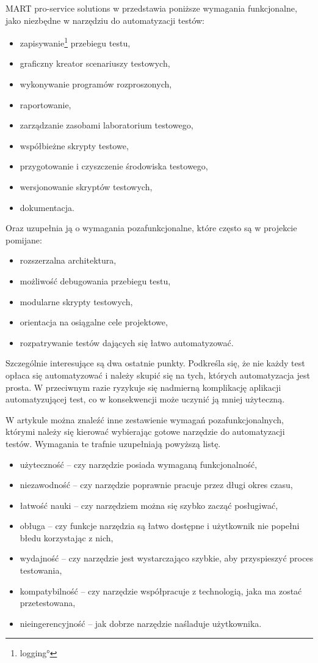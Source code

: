 \documentclass[00-praca-magisterska.tex]{subfiles}
\begin{document}
MART pro-service solutions w \cite{automation-fail} przedstawia poniższe
wymagania funkcjonalne, jako niezbędne w narzędziu do automatyzacji testów:
\begin{itemize}
\item zapisywanie\footnote{\ang{logging}} przebiegu testu,
\item graficzny kreator scenariuszy testowych,
\item wykonywanie programów rozproszonych,
\item raportowanie,
\item zarządzanie zasobami laboratorium testowego,
\item współbieżne skrypty testowe,
\item przygotowanie i czyszczenie środowiska testowego,
\item wersjonowanie skryptów testowych,
\item dokumentacja.
\end{itemize}

Oraz uzupełnia ją o wymagania pozafunkcjonalne, które często są w projekcie
pomijane:
\begin{itemize}
\item rozszerzalna architektura,
\item możliwość debugowania przebiegu testu,
\item modularne skrypty testowych,
\item orientacja na osiągalne cele projektowe,
\item rozpatrywanie testów dających się łatwo automatyzować.
\end{itemize}

Szczególnie interesujące są dwa ostatnie punkty. Podkreśla się, że nie każdy
test opłaca się automatyzować i należy skupić się na tych, których
automatyzacja jest prosta. W przeciwnym razie ryzykuje się nadmierną
komplikację aplikacji automatyzującej test, co w konsekwencji może uczynić ją
mniej użyteczną.

W artykule \cite{snake-oil} można znaleźć inne zestawienie wymagań
pozafunkcjonalnych, którymi należy się kierować wybierając gotowe narzędzie do
automatyzacji testów. Wymagania te trafnie uzupełniają powyższą listę.
\begin{itemize}
\item użyteczność -- czy narzędzie posiada wymaganą funkcjonalność,
\item niezawodność -- czy narzędzie poprawnie pracuje przez długi okres czasu,
\item łatwość nauki -- czy narzędziem można się szybko zacząć posługiwać,
\item obługa -- czy funkcje narzędzia są łatwo dostępne i użytkownik nie popełni błedu korzystając z nich,
\item wydajność -- czy narzędzie jest wystarczająco szybkie, aby przyspieszyć proces testowania,
\item kompatybilność -- czy narzędzie współpracuje z technologią, jaka ma zostać przetestowana,
\item nieingerencyjność -- jak dobrze narzędzie naśladuje użytkownika.
\end{itemize}
\end{document}
